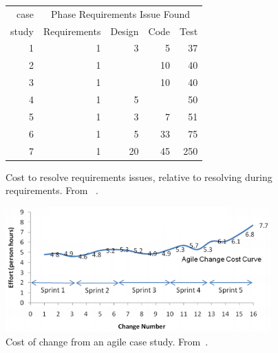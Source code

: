 \documentclass[smallcondesed]{svjour3}
\begin{document}
 


 \begin{figure}
{\small
\begin{center}
\begin{tabular}{r|rrrr}
 case& \multicolumn{4}{c}{Phase Requirements Issue Found }  \\
 study               &Requirements & Design & Code&  Test\\\hline
1& 1 &3& 5& 37\\  
2& 1  &    & 10 & 40 \\ 
3& 1   &    & 10 &  40 \\
4&  1  &   5 &      & 50  \\
5&  1 &3& 7& 51 \\
6& 1& 5 &33 &75  \\
7&  1 & 20 & 45 & 250 \\  
\end{tabular}
\end{center}}
\caption{Cost to resolve requirements issues, relative to resolving  during requirements. From ~\cite{steck04}.}\label{fig:steck}
\end{figure}


\begin{figure}[!t]
\begin{center}
 \includegraphics[width=4in]{img/clutterbuck.png} 
 \end{center}
 \caption{Cost of change from an agile case study. From~\cite{Clutterbuck09}.}\label{fig:clutterbuck}
 \end{figure}

 
 
\end{document}
